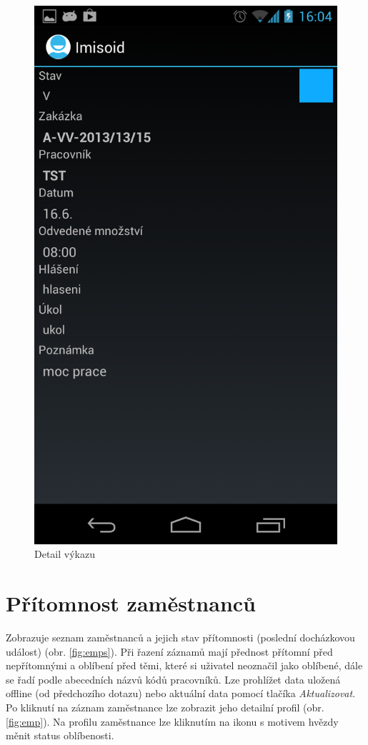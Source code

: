 \documentclass{diplomka}
\begin{document}
\begin{figure}[H]
  \centering
  \includegraphics[scale=0.25]{scr/record.png}
  \caption{Detail výkazu}
  \label{fig:record}
\end{figure}

\section{Přítomnost zaměstnanců}
\label{sec:emps}
Zobrazuje seznam zaměstnanců a jejich stav přítomnosti (poslední docházkovou událost) (obr. \ref{fig:emps}). Při řazení záznamů mají přednost přítomní před nepřítomnými a oblíbení před těmi, které si uživatel neoznačil jako oblíbené, dále se řadí podle abecedních názvů kódů pracovníků. Lze prohlížet data uložená offline (od předchozího dotazu) nebo aktuální data pomocí tlačíka \emph{Aktualizovat}. Po kliknutí na záznam zaměstnance lze zobrazit jeho detailní profil (obr. \ref{fig:emp}). Na profilu zaměstnance lze kliknutím na ikonu s motivem hvězdy měnit status oblíbenosti.
\end{document}

